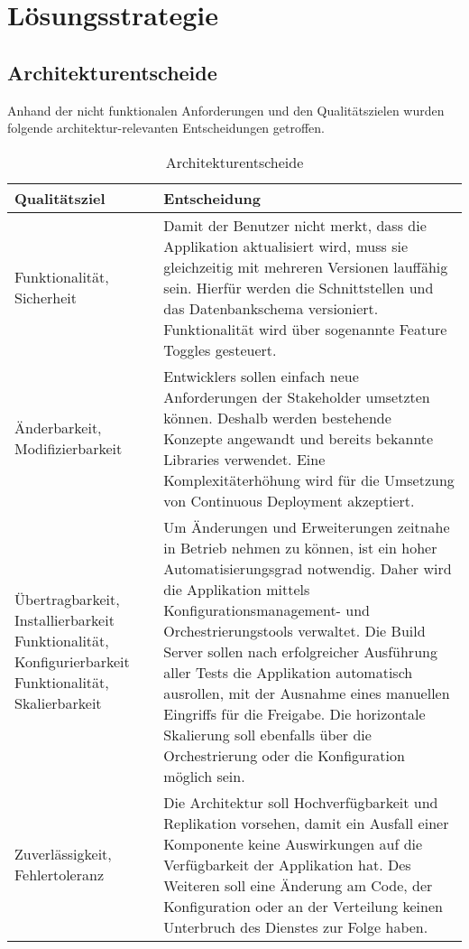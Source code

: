 \chapter{Lösungsstrategie}

\section{Architekturentscheide}

Anhand der nicht funktionalen Anforderungen und den Qualitätszielen wurden folgende architektur-relevanten Entscheidungen getroffen.

\begin{table}[H]
	\centering
	\caption{Architekturentscheide}
	\begin{tabular}{ | p{4cm} | p{11cm} | }
		\toprule
		{\textbf{Qualitätsziel}} & {\textbf{Entscheidung}} \\
		\midrule
		Funktionalität, Sicherheit &  Damit der Benutzer nicht merkt, dass die Applikation aktualisiert wird, muss sie gleichzeitig mit mehreren Versionen lauffähig sein. Hierfür werden die Schnittstellen und das Datenbankschema versioniert. Funktionalität wird über sogenannte Feature Toggles gesteuert.\\ \hline
		Änderbarkeit, Modifizierbarkeit & Entwicklers sollen einfach neue Anforderungen der Stakeholder umsetzten können. Deshalb werden bestehende Konzepte angewandt und bereits bekannte Libraries verwendet. Eine Komplexitäterhöhung wird für die Umsetzung von Continuous Deployment akzeptiert. \\ \hline
		Übertragbarkeit, Installierbarkeit \newline Funktionalität, Konfigurierbarkeit \newline Funktionalität, Skalierbarkeit & Um Änderungen und Erweiterungen zeitnahe in Betrieb nehmen zu können, ist ein hoher Automatisierungsgrad notwendig. Daher wird die Applikation mittels Konfigurationsmanagement- und Orchestrierungstools verwaltet. Die Build Server sollen nach erfolgreicher Ausführung aller Tests die Applikation automatisch ausrollen, mit der Ausnahme eines manuellen Eingriffs für die Freigabe. Die horizontale Skalierung soll ebenfalls über die Orchestrierung oder die Konfiguration möglich sein.\\ \hline
		Zuverlässigkeit, Fehlertoleranz &  Die Architektur soll Hochverfügbarkeit und Replikation vorsehen, damit ein Ausfall einer Komponente keine Auswirkungen auf die Verfügbarkeit der Applikation hat. Des Weiteren soll eine Änderung am Code, der Konfiguration oder an der Verteilung keinen Unterbruch des Dienstes zur Folge haben.\\
		\bottomrule
	\end{tabular}
\end{table}
\newpage
